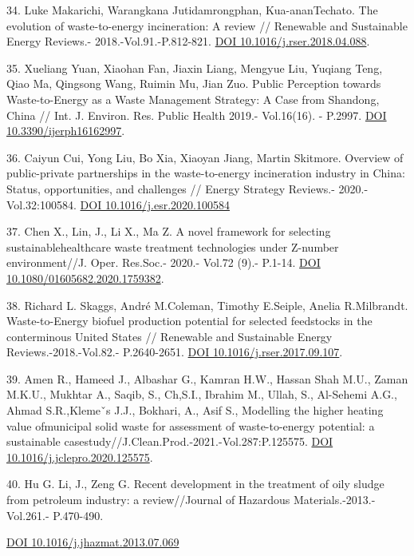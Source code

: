 \begin{references}
34. Luke Makarichi, Warangkana Jutidamrongphan, Kua-ananTechato. The
evolution of waste-to-energy incineration: A review // Renewable and
Sustainable Energy Reviews.- 2018.-Vol.91.-P.812-821.
\href{https://doi.org/10.1016/j.rser.2018.04.088}{DOI
10.1016/j.rser.2018.04.088}.

35. Xueliang Yuan, Xiaohan Fan, Jiaxin Liang, Mengyue Liu, Yuqiang Teng,
Qiao Ma, Qingsong Wang, Ruimin Mu, Jian Zuo. Public Perception towards
Waste-to-Energy as a Waste Management Strategy: A Case from Shandong,
China // Int. J. Environ. Res. Public Health 2019.- Vol.16(16). -
P.2997. \href{https://doi.org/10.3390/ijerph16162997}{DOI
10.3390/ijerph16162997}.

36. Caiyun Cui, Yong Liu, Bo Xia, Xiaoyan Jiang, Martin Skitmore.
Overview of public-private partnerships in the waste-to-energy
incineration industry in China: Status, opportunities, and challenges //
Energy Strategy Reviews.- 2020.- Vol.32:100584.
\href{https://doi.org/\%20DOI\%2010.1016/j.esr.2020.100584}{DOI
10.1016/j.esr.2020.100584}

37. Chen X., Lin, J., Li X., Ma Z. A novel framework for selecting
sustainablehealthcare waste treatment technologies under Z-number
environment//J. Oper. Res.Soc.- 2020.- Vol.72 (9).- P.1-14.
\href{https://doi.org/10.1080/01605682.2020.1759382}{DOI
10.1080/01605682.2020.1759382}.

38. Richard L. Skaggs, André M.Coleman, Timothy E.Seiple, Anelia
R.Milbrandt. Waste-to-Energy biofuel production potential for selected
feedstocks in the conterminous United States // Renewable and
Sustainable Energy Reviews.-2018.-Vol.82.- P.2640-2651.
\href{https://doi.org/10.1016/j.rser.2017.09.107}{DOI
10.1016/j.rser.2017.09.107}.

39. Amen R., Hameed J., Albashar G., Kamran H.W., Hassan Shah M.U.,
Zaman M.K.U., Mukhtar A., Saqib, S., Ch,S.I., Ibrahim M., Ullah, S.,
Al-Sehemi A.G., Ahmad S.R.,Klemeˇs J.J., Bokhari, A., Asif S., Modelling
the higher heating value ofmunicipal solid waste for assessment of
waste-to-energy potential: a sustainable
casestudy//J.Clean.Prod.-2021.-Vol.287:P.125575.
\href{https://doi.org/10.1016/j.jclepro.2020.125575}{DOI
10.1016/j.jclepro.2020.125575}.

40. Hu G. Li, J., Zeng G. Recent development in the treatment of oily
sludge from petroleum industry: a review//Journal of Hazardous
Materials.-2013.- Vol.261.- P.470-490.

\href{https://doi.org/10.1016/j.jhazmat.2013.07.069}{DOI
10.1016/j.jhazmat.2013.07.069}


\end{references}
